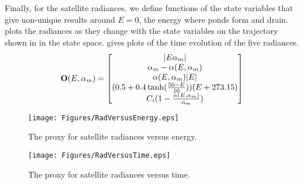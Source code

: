 \par Finally, for the satellite radiances, we define functions of the state variables that give non-unique results around $E=0$, the energy where ponds form and drain.  plots the radiances as they change with the state variables on the trajectory shown in  in the state space.  gives plots of the time evolution of the five radiances.
\begin{equation}\label{eq:radiances}
\textbf{O}(E,\alpha_m) = 
\begin{bmatrix}
|E\alpha_m|\\ 
\alpha_m-\alpha(E,\alpha_m) \\
\alpha(E,\alpha_m)|E|\\
(0.5+0.4\tanh(\frac{50-E}{10}))(E+273.15)\\
C_i (1-\frac{\alpha(E,\alpha_m)}{\alpha_m})
\end{bmatrix}
\end{equation}

\begin{figure}\label{fig:radversusenergy}
\begin{center}
\texttt{[image: Figures/RadVersusEnergy.eps]} 
\end{center}
\caption{The proxy for satellite radiances versus energy.}
\end{figure}

\begin{figure}\label{fig:radversustime}
\begin{center}
\texttt{[image: Figures/RadVersusTime.eps]} 
\end{center}
\caption{The proxy for satellite radiances versus time.}
\end{figure}

